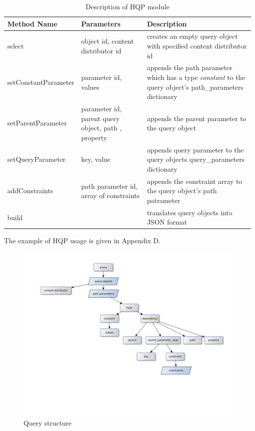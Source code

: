 \begin{center}
	\begin{table}
		\label{table:hqp_parameters}
	  	\caption{Description of HQP module}
		\begin{tabular}{|l|p{1in}|p{3in}|}
	    \hline
	    Method Name & Parameters & Description  \\ \hline
	    select & object id, content distributor id & creates an empty query object with specified content distributor id  \\ \hline
	    setConstantParameter & parameter id, values & appends the path parameter which has a type \textit{constant} to the query object's path\_parameters dictionary  \\ \hline
	    setParentParameter & parameter id, parent query object, path , property & appends the parent parameter to the query object  \\ \hline
	    setQueryParameter & key, value & appends query parameter to the query objects query\_parameters dictionary \\ \hline
	    addConstraints & path parameter id, array of constraints& appends the constraint array to the query object's path patrameter \\ \hline
	    build & &  translates query objects into JSON format  \\ \hline
	    \hline
	  	\end{tabular}
  	\end{table}
\end{center}

The example of HQP usage is given in Appendix D.


\begin{figure}[h]
    \centering
	\includegraphics[width=\textwidth]{images/query_structure.png}
    \caption{Query structure}
    \label{fig:query_structure}
\end{figure}


